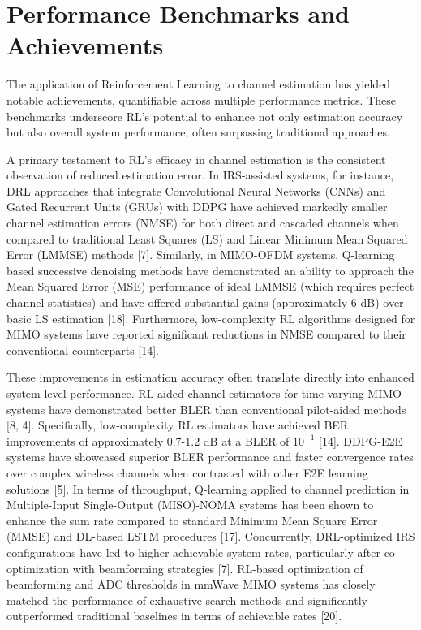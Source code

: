 \documentclass[journal,twocolumn]{IEEEtran}
\begin{document}
\section{Performance Benchmarks and Achievements}

The application of Reinforcement Learning to channel estimation has yielded notable achievements, quantifiable across multiple performance metrics. These benchmarks underscore RL's potential to enhance not only estimation accuracy but also overall system performance, often surpassing traditional approaches.

A primary testament to RL's efficacy in channel estimation is the consistent observation of reduced estimation error. In IRS-assisted systems, for instance, DRL approaches that integrate Convolutional Neural Networks (CNNs) and Gated Recurrent Units (GRUs) with DDPG have achieved markedly smaller channel estimation errors (NMSE) for both direct and cascaded channels when compared to traditional Least Squares (LS) and Linear Minimum Mean Squared Error (LMMSE) methods [7]. Similarly, in MIMO-OFDM systems, Q-learning based successive denoising methods have demonstrated an ability to approach the Mean Squared Error (MSE) performance of ideal LMMSE (which requires perfect channel statistics) and have offered substantial gains (approximately 6 dB) over basic LS estimation [18]. Furthermore, low-complexity RL algorithms designed for MIMO systems have reported significant reductions in NMSE compared to their conventional counterparts [14].

These improvements in estimation accuracy often translate directly into enhanced system-level performance. RL-aided channel estimators for time-varying MIMO systems have demonstrated better BLER than conventional pilot-aided methods [8, 4]. Specifically, low-complexity RL estimators have achieved BER improvements of approximately 0.7-1.2 dB at a BLER of $10^{-1}$ [14]. DDPG-E2E systems have showcased superior BLER performance and faster convergence rates over complex wireless channels when contrasted with other E2E learning solutions [5]. In terms of throughput, Q-learning applied to channel prediction in Multiple-Input Single-Output (MISO)-NOMA systems has been shown to enhance the sum rate compared to standard Minimum Mean Square Error (MMSE) and DL-based LSTM procedures [17]. Concurrently, DRL-optimized IRS configurations have led to higher achievable system rates, particularly after co-optimization with beamforming strategies [7]. RL-based optimization of beamforming and ADC thresholds in mmWave MIMO systems has closely matched the performance of exhaustive search methods and significantly outperformed traditional baselines in terms of achievable rates [20].
\end{document}
